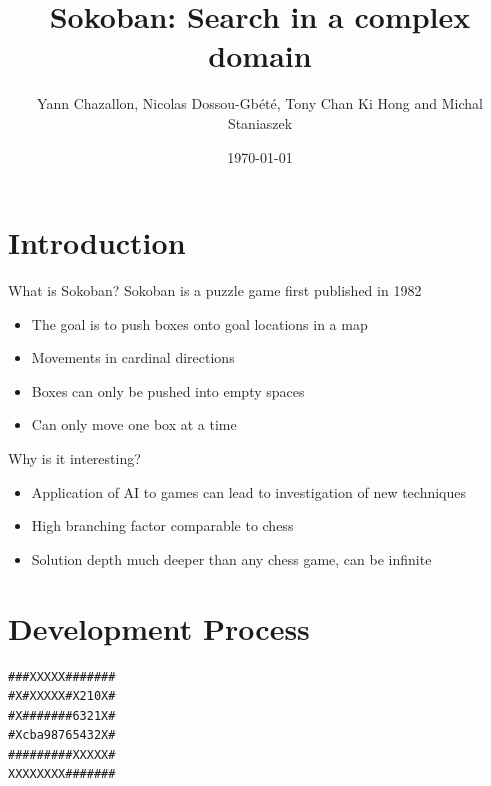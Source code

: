 \documentclass{beamer}
\title[Sokoban] %
{Sokoban: Search in a complex domain}
\author[Chazallon, Dossou-Gb{\'e}t{\'e}, Hong, Staniaszek]{Yann Chazallon,  Nicolas Dossou-Gb{\'e}t{\'e}, Tony Chan Ki Hong and Michal Staniaszek}
\date{\today}
\begin{document}
\begin{frame}
  \titlepage
\end{frame}

\section{Introduction}

\begin{frame}{What is Sokoban?}
  Sokoban is a puzzle game first published in 1982
  \begin{itemize}
    \item The goal is to push boxes onto goal locations in a map
    \item Movements in cardinal directions
    \item Boxes can only be pushed into empty spaces
    \item Can only move one box at a time
  \end{itemize}
\end{frame} 

\begin{frame}{Why is it interesting?}
  \begin{itemize}
  \item Application of AI to games can lead to investigation of new techniques
  \item High branching factor comparable to chess
  \item Solution depth much deeper than any chess game, can be infinite
  \end{itemize}
\end{frame}

\section{Development Process}


\begin{lrbox}{\mapstatic}
  \begin{minipage}{.25\textwidth}
\centering
\begin{BVerbatim}
###XXXXX#######
#X#XXXXX#X210X#
#X#######6321X#
#Xcba98765432X#
#########XXXXX#
XXXXXXXX#######
\end{BVerbatim}
  \end{minipage}
\end{lrbox}%
\end{document}
